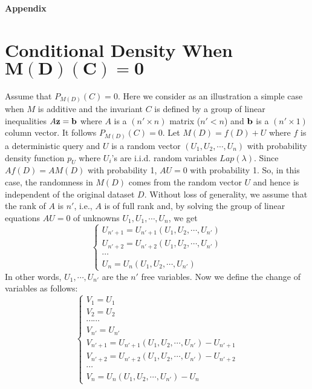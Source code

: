 \documentclass[11pt]{article}
\begin{document}

\clearpage
\centerline{\textbf{\Large Appendix}}
\renewcommand\thesection{\Alph{section}}
\setcounter{section}{0}
\section{Conditional Density When $\boldsymbol{M(D)(C)=0}$}

Assume that $P_{M(D)}(C) = 0$.    Here we consider as an illustration a simple case when $M$  is additive and the invariant $C$ is defined by a group of linear inequalities $A\bold{z} = \bold{b}$ where $A$ is a $(n'\times n)$ matrix ($n' < n$) and $\bold{b}$ is a $(n'\times 1)$ column vector. It follows  $P_{M(D)}(C) = 0$. Let $M(D) = f(D) + U$ where $f$ is a deterministic query and $U$ is a random vector $(U_1, U_2, \cdots, U_n)$ with probability density function $p_U$ where $U_i$'s are i.i.d. random variables $Lap(\lambda)$.  Since $Af(D) = AM(D)$ with probability 1, $A U =0$ with probability 1. So, in this case, the randomness in $M(D)$ comes from the random vector $U$ and hence is independent of the original dataset $D$.  Without loss of generality, we assume that the rank of $A$ is $n'$, i.e., $A$ is of full rank and, by solving the group of linear equations $AU=0$ of unknowns $U_1, U_1, \cdots, U_n$, we get 
$$ \left\{
\begin{array}{lr}
U_{n'+1}= U_{n'+1}(U_1, U_2, \cdots, U_{n'})\\
U_{n'+2}= U_{n'+2} (U_1, U_2, \cdots, U_{n'})\\
\cdots \\
U_{n} = U_n (U_1, U_2, \cdots, U_{n'})
\end{array}
\right. $$
In other words, $U_1, \cdots, U_{n'}$ are the $n'$ free variables.  Now we define the change of variables as follows:
$$ \left\{
\begin{array}{lr}
V_1 = U_1 \\
V_2 = U_2 \\
\cdots \cdots \\
V_{n'} = U_{n'}\\
V_{n'+1}= U_{n'+1}(U_1, U_2, \cdots, U_{n'}) - U_{n'+1}\\
V_{n'+2}= U_{n'+2} (U_1, U_2, \cdots, U_{n'}) - U_{n'+2}\\
\cdots \\
V_{n} = U_n (U_1, U_2, \cdots, U_{n'}) - U_n
\end{array}
\right. $$
\end{document}
